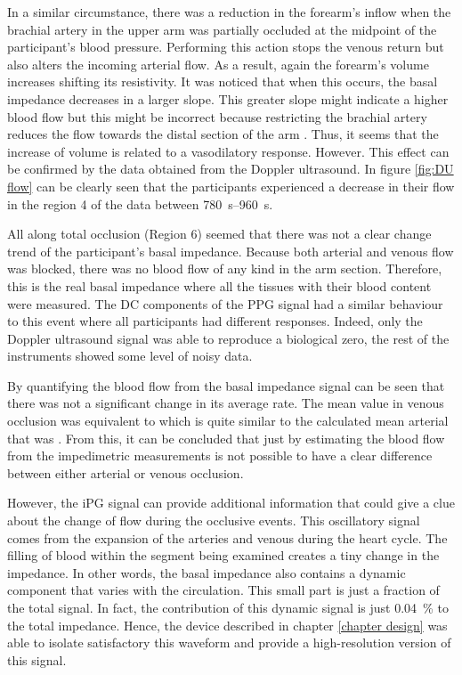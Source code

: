 In a similar circumstance, there was a reduction in the forearm's inflow when the brachial artery in the upper arm was partially occluded at the midpoint of the participant's blood pressure. Performing this action stops the venous return but also alters the incoming arterial flow. As a result, again the forearm's volume increases shifting its resistivity. It was noticed that when this occurs, the basal impedance decreases in a larger slope. This greater slope might indicate a higher blood flow but this might be incorrect because restricting the brachial artery reduces the flow towards the distal section of the arm \cite{mccully2004muscle}. Thus, it seems that the increase of volume is related to a vasodilatory response. However. This effect can be confirmed by the data obtained from the Doppler ultrasound. In figure \ref{fig:DU flow} can be clearly seen that the participants experienced a decrease in their flow in the region 4 of the data between \SIrange{780}{960}{\second}.


All along total occlusion (Region 6) seemed that there was not a clear change trend of the participant's basal impedance.  Because both arterial and venous flow was blocked, there was no blood flow of any kind in the arm section. Therefore, this is the real basal impedance where all the tissues with their blood content were measured. The DC components of the PPG signal had a similar behaviour to this event where all participants had different responses. Indeed, only the Doppler ultrasound signal was able to reproduce a biological zero, the rest of the instruments showed some level of noisy data. 

By quantifying the blood flow from the basal impedance signal can be seen that there was not a significant change in its average rate. The mean value in venous occlusion was equivalent to \flowbasalvenous{} which is quite similar to the calculated mean arterial that was \flowbasalarterial{}. From this, it can be concluded that just by estimating the blood flow from the impedimetric measurements is not possible to have a clear difference between either arterial or venous occlusion.

However, the iPG signal can provide additional information that could give a clue about the change of flow during the occlusive events. This oscillatory signal comes from the expansion of the arteries and venous during the heart cycle. The filling of blood within the segment being examined creates a tiny change in the impedance. In other words, the basal impedance also contains a dynamic component that varies with the circulation. This small part is just a fraction of the total signal. In fact, the contribution of this dynamic signal is just \SI{0.04}{\percent} to the total impedance. Hence, the device described in chapter \ref{chapter design} was able to isolate satisfactory this waveform and provide a high-resolution version of this signal.

